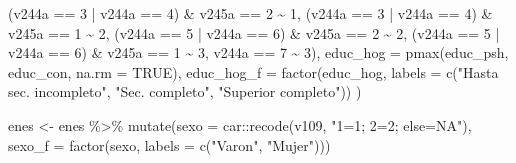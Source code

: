 \documentclass[
]{book}
\newenvironment{Shaded}{\begin{snugshade}}{\end{snugshade}}
\newcommand{\AttributeTok}[1]{\textcolor[rgb]{0.77,0.63,0.00}{#1}}
\newcommand{\ConstantTok}[1]{\textcolor[rgb]{0.00,0.00,0.00}{#1}}
\newcommand{\DecValTok}[1]{\textcolor[rgb]{0.00,0.00,0.81}{#1}}
\newcommand{\FunctionTok}[1]{\textcolor[rgb]{0.00,0.00,0.00}{#1}}
\newcommand{\NormalTok}[1]{#1}
\newcommand{\OtherTok}[1]{\textcolor[rgb]{0.56,0.35,0.01}{#1}}
\newcommand{\SpecialCharTok}[1]{\textcolor[rgb]{0.00,0.00,0.00}{#1}}
\newcommand{\StringTok}[1]{\textcolor[rgb]{0.31,0.60,0.02}{#1}}
\begin{document}
\begin{Shaded}
\begin{Highlighting}[]
\NormalTok{                                                            (v244a }\SpecialCharTok{==} \DecValTok{3} \SpecialCharTok{|}\NormalTok{ v244a }\SpecialCharTok{==} \DecValTok{4}\NormalTok{) }\SpecialCharTok{\&}\NormalTok{ v245a }\SpecialCharTok{==} \DecValTok{2} \SpecialCharTok{\textasciitilde{}} \DecValTok{1}\NormalTok{,}
\NormalTok{                                                            (v244a }\SpecialCharTok{==} \DecValTok{3} \SpecialCharTok{|}\NormalTok{ v244a }\SpecialCharTok{==} \DecValTok{4}\NormalTok{) }\SpecialCharTok{\&}\NormalTok{ v245a }\SpecialCharTok{==} \DecValTok{1} \SpecialCharTok{\textasciitilde{}} \DecValTok{2}\NormalTok{,}
\NormalTok{                                                            (v244a }\SpecialCharTok{==} \DecValTok{5} \SpecialCharTok{|}\NormalTok{ v244a }\SpecialCharTok{==} \DecValTok{6}\NormalTok{) }\SpecialCharTok{\&}\NormalTok{ v245a }\SpecialCharTok{==} \DecValTok{2} \SpecialCharTok{\textasciitilde{}} \DecValTok{2}\NormalTok{,}
\NormalTok{                                                            (v244a }\SpecialCharTok{==} \DecValTok{5} \SpecialCharTok{|}\NormalTok{ v244a }\SpecialCharTok{==} \DecValTok{6}\NormalTok{) }\SpecialCharTok{\&}\NormalTok{ v245a }\SpecialCharTok{==} \DecValTok{1} \SpecialCharTok{\textasciitilde{}} \DecValTok{3}\NormalTok{,}
\NormalTok{                                                            v244a }\SpecialCharTok{==} \DecValTok{7} \SpecialCharTok{\textasciitilde{}} \DecValTok{3}\NormalTok{),}
                 \AttributeTok{educ\_hog =} \FunctionTok{pmax}\NormalTok{(educ\_psh, educ\_con, }\AttributeTok{na.rm =} \ConstantTok{TRUE}\NormalTok{),}
                 \AttributeTok{educ\_hog\_f =} \FunctionTok{factor}\NormalTok{(educ\_hog, }\AttributeTok{labels =} \FunctionTok{c}\NormalTok{(}\StringTok{"Hasta sec. incompleto"}\NormalTok{, }\StringTok{"Sec. completo"}\NormalTok{, }
                                                                                                 \StringTok{"Superior completo"}\NormalTok{))}
\NormalTok{                 )}
    
\NormalTok{enes }\OtherTok{\textless{}{-}}\NormalTok{ enes }\SpecialCharTok{\%\textgreater{}\%} 
    \FunctionTok{mutate}\NormalTok{(}\AttributeTok{sexo =}\NormalTok{ car}\SpecialCharTok{::}\FunctionTok{recode}\NormalTok{(v109, }\StringTok{"1=1; 2=2; else=NA"}\NormalTok{),}
                 \AttributeTok{sexo\_f =} \FunctionTok{factor}\NormalTok{(sexo, }\AttributeTok{labels =} \FunctionTok{c}\NormalTok{(}\StringTok{"Varon"}\NormalTok{, }\StringTok{"Mujer"}\NormalTok{)))}
\end{Highlighting}
\end{Shaded}
\end{document}
